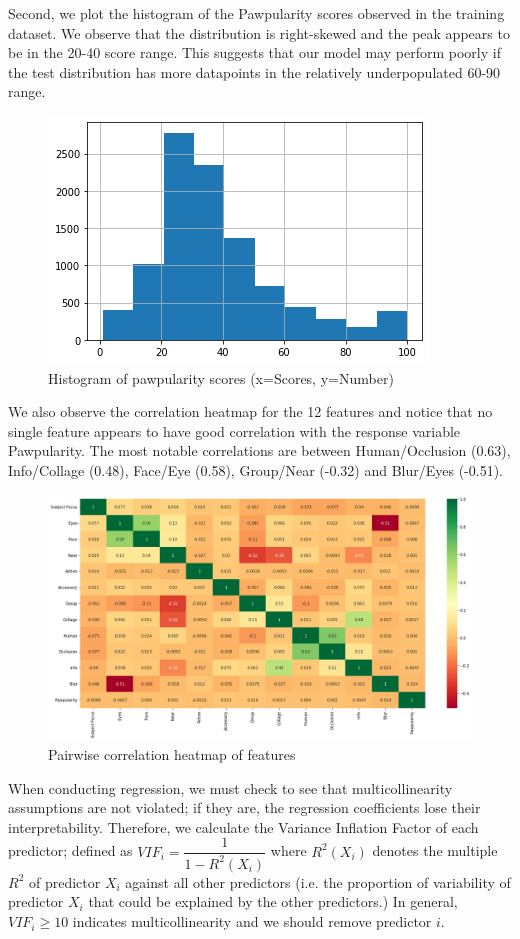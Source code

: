 \documentclass[12pt]{article}
\begin{document}
Second, we plot the histogram of the Pawpularity scores observed in the training dataset. We observe that the distribution is right-skewed and the peak appears to be in the 20-40 score range. This suggests that our model may perform poorly if the test distribution has more datapoints in the relatively underpopulated 60-90 range.
\begin{figure}[h]
\caption{Histogram of pawpularity scores (x=Scores, y=Number)}
\centering
\includegraphics[scale=0.4]{1_pawpularity}
\end{figure}

We also observe the correlation heatmap for the 12 features and notice that no single feature appears to have good correlation with the response variable Pawpularity. The most notable correlations are between Human/Occlusion (0.63), Info/Collage (0.48), Face/Eye (0.58), Group/Near (-0.32) and Blur/Eyes (-0.51).
\begin{figure}[h]
\caption{Pairwise correlation heatmap of features}
\centering
\includegraphics[scale=0.3]{2_correlation}
\end{figure}

When conducting regression, we must check to see that multicollinearity assumptions are not violated; if they are, the regression coefficients lose their interpretability. Therefore, we calculate the Variance Inflation Factor of each predictor; defined as $VIF_{i}=\dfrac{1}{1-R^{2}(X_i)}$ where $R^{2}(X_i)$ denotes the multiple $R^2$ of predictor $X_i$ against all other predictors (i.e. the proportion of variability of predictor $X_i$ that could be explained by the other predictors.) In general, $VIF_{i}\geq10$ indicates multicollinearity and we should remove predictor $i$.\newline
\end{document}

